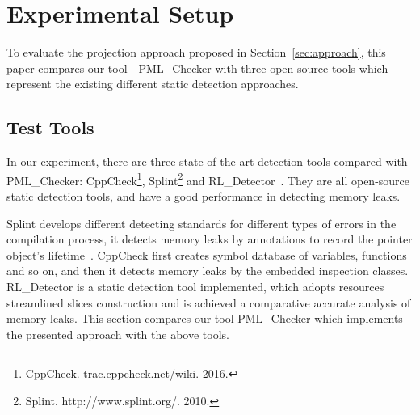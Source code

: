 \section{Experimental Setup}\label{sec:setup}
To evaluate the projection approach proposed in Section~\ref{sec:approach}, 
this paper compares our tool---PML\_Checker with three open-source tools which represent the existing different static detection approaches. 
\subsection{Test Tools}\label{ssec:tool}
In our experiment, there are three state-of-the-art detection tools compared with PML\_Checker: CppCheck\footnote{CppCheck. trac.cppcheck.net/wiki. 2016.}, Splint\footnote{Splint. http://www.splint.org/. 2010.} and RL\_Detector~\cite{J14}. They are all open-source static detection tools, and have a good performance in detecting memory leaks.

Splint develops different detecting standards for different types of errors in the compilation process, it detects memory leaks by annotations to record the pointer object’s lifetime~\cite{EL02}. CppCheck first creates symbol database of variables, functions and so on, and then it detects memory leaks by the embedded inspection classes. RL\_Detector is a static detection tool implemented, which adopts resources streamlined slices construction and is achieved a comparative accurate analysis of memory leaks. This section compares our tool PML\_Checker which implements the presented approach with the above tools.
